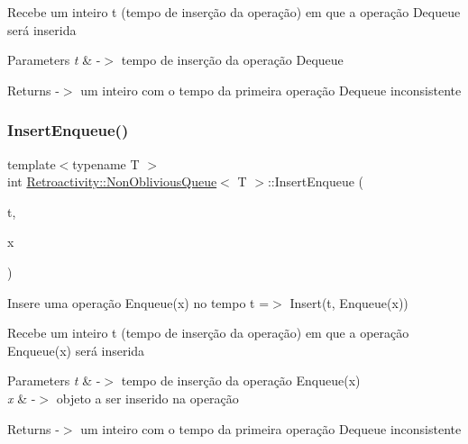 Recebe um inteiro t (tempo de inserção da operação) em que a operação Dequeue será inserida


\begin{DoxyParams}{Parameters}
{\em t} & -\/$>$ tempo de inserção da operação Dequeue \\
\hline
\end{DoxyParams}
\begin{DoxyReturn}{Returns}
-\/$>$ um inteiro com o tempo da primeira operação Dequeue inconsistente 
\end{DoxyReturn}
\mbox{\label{classRetroactivity_1_1NonObliviousQueue_a725f518de41fb73143c2a344624c07f1}} 
\subsubsection{\texorpdfstring{Insert\+Enqueue()}{InsertEnqueue()}}
{\footnotesize\ttfamily template$<$typename T $>$ \\
int \hyperlink{classRetroactivity_1_1NonObliviousQueue}{Retroactivity\+::\+Non\+Oblivious\+Queue}$<$ T $>$\+::Insert\+Enqueue (\begin{DoxyParamCaption}\item[{int}]{t,  }\item[{T}]{x }\end{DoxyParamCaption})}

Insere uma operação Enqueue(x) no tempo t =$>$ Insert(t, Enqueue(x))

Recebe um inteiro t (tempo de inserção da operação) em que a operação Enqueue(x) será inserida


\begin{DoxyParams}{Parameters}
{\em t} & -\/$>$ tempo de inserção da operação Enqueue(x) \\
\hline
{\em x} & -\/$>$ objeto a ser inserido na operação \\
\hline
\end{DoxyParams}
\begin{DoxyReturn}{Returns}
-\/$>$ um inteiro com o tempo da primeira operação Dequeue inconsistente 
\end{DoxyReturn}
\mbox{\label{classRetroactivity_1_1NonObliviousQueue_a006b0d3710fad54f61e620f95dd3c67c}} 
